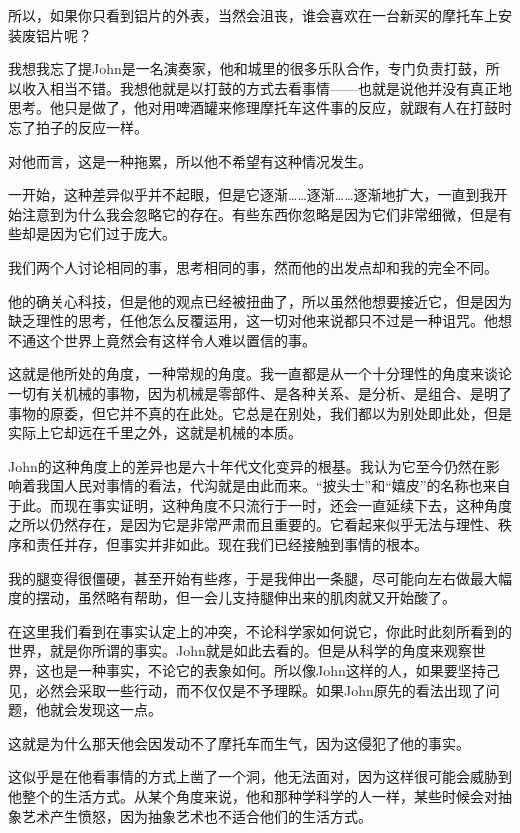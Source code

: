 \documentclass[UTF8]{article}
\begin{document}
\par 所以，如果你只看到铝片的外表，当然会沮丧，谁会喜欢在一台新买的摩托车上安装废铝片呢？
\par 我想我忘了提John是一名演奏家，他和城里的很多乐队合作，专门负责打鼓，所以收入相当不错。我想他就是以打鼓的方式去看事情——也就是说他并没有真正地思考。他只是做了，他对用啤酒罐来修理摩托车这件事的反应，就跟有人在打鼓时忘了拍子的反应一样。
\par 对他而言，这是一种拖累，所以他不希望有这种情况发生。
\par 一开始，这种差异似乎并不起眼，但是它逐渐……逐渐……逐渐地扩大，一直到我开始注意到为什么我会忽略它的存在。有些东西你忽略是因为它们非常细微，但是有些却是因为它们过于庞大。
\par 我们两个人讨论相同的事，思考相同的事，然而他的出发点却和我的完全不同。
\par 他的确关心科技，但是他的观点已经被扭曲了，所以虽然他想要接近它，但是因为缺乏理性的思考，任他怎么反覆运用，这一切对他来说都只不过是一种诅咒。他想不通这个世界上竟然会有这样令人难以置信的事。
\par 这就是他所处的角度，一种常规的角度。我一直都是从一个十分理性的角度来谈论一切有关机械的事物，因为机械是零部件、是各种关系、是分析、是组合、是明了事物的原委，但它并不真的在此处。它总是在别处，我们都以为别处即此处，但是实际上它却远在千里之外，这就是机械的本质。
\par John的这种角度上的差异也是六十年代文化变异的根基。我认为它至今仍然在影响着我国人民对事情的看法，代沟就是由此而来。“披头士”和“嬉皮”的名称也来自于此。而现在事实证明，这种角度不只流行于一时，还会一直延续下去，这种角度之所以仍然存在，是因为它是非常严肃而且重要的。它看起来似乎无法与理性、秩序和责任并存，但事实并非如此。现在我们已经接触到事情的根本。
\par 我的腿变得很僵硬，甚至开始有些疼，于是我伸出一条腿，尽可能向左右做最大幅度的摆动，虽然略有帮助，但一会儿支持腿伸出来的肌肉就又开始酸了。
\par 在这里我们看到在事实认定上的冲突，不论科学家如何说它，你此时此刻所看到的世界，就是你所谓的事实。John就是如此去看的。但是从科学的角度来观察世界，这也是一种事实，不论它的表象如何。所以像John这样的人，如果要坚持己见，必然会采取一些行动，而不仅仅是不予理睬。如果John原先的看法出现了问题，他就会发现这一点。
\par 这就是为什么那天他会因发动不了摩托车而生气，因为这侵犯了他的事实。
\par 这似乎是在他看事情的方式上凿了一个洞，他无法面对，因为这样很可能会威胁到他整个的生活方式。从某个角度来说，他和那种学科学的人一样，某些时候会对抽象艺术产生愤怒，因为抽象艺术也不适合他们的生活方式。
\end{document}
